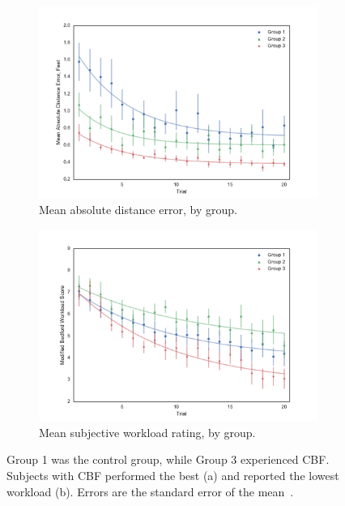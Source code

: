 \documentclass[float=false, crop=false]{standalone}
\begin{document}
\begin{figure}[tb!]
    \begin{center}
        \begin{subfigure}{0.49\textwidth}
	        \includegraphics[width=\linewidth]{./../img/Group_absDistErr_clean_fit_30.pdf}
	        \caption{Mean absolute distance error, by group.}
	        \label{figure:saferdistance}
        \end{subfigure}\hfill
        \begin{subfigure}{0.49\textwidth}
	        \includegraphics[width=\linewidth]{./../img/Group_Workload_fit_30.pdf}
	        \caption{Mean subjective workload rating, by group.}
	        \label{figure:saferworkload}
        \end{subfigure}
        \caption{Group 1 was the control group, while Group 3 experienced CBF. Subjects with CBF performed the best (a) and reported the lowest workload (b). Errors are the standard error of the mean~\cite{Karasinski2016Masters}.}
    \end{center}
\end{figure}
\end{document}
